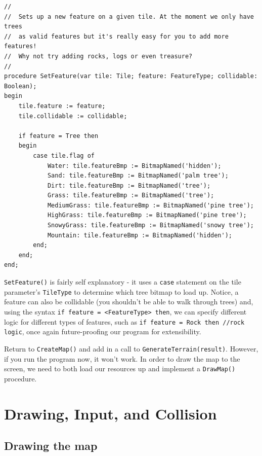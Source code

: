\documentclass{article}
\begin{document}
\begin{verbatim}
//
//	Sets up a new feature on a given tile. At the moment we only have trees
//	as valid features but it's really easy for you to add more features! 
//	Why not try adding rocks, logs or even treasure?
//
procedure SetFeature(var tile: Tile; feature: FeatureType; collidable: Boolean);
begin
	tile.feature := feature;
	tile.collidable := collidable;

	if feature = Tree then
	begin
		case tile.flag of
			Water: tile.featureBmp := BitmapNamed('hidden');
			Sand: tile.featureBmp := BitmapNamed('palm tree');
			Dirt: tile.featureBmp := BitmapNamed('tree');
			Grass: tile.featureBmp := BitmapNamed('tree');
			MediumGrass: tile.featureBmp := BitmapNamed('pine tree');
			HighGrass: tile.featureBmp := BitmapNamed('pine tree');
			SnowyGrass: tile.featureBmp := BitmapNamed('snowy tree');
			Mountain: tile.featureBmp := BitmapNamed('hidden');
		end;
	end;
end;
\end{verbatim}

\texttt{SetFeature()} is fairly self explanatory - it uses a \texttt{case} statement on the tile parameter's \texttt{TileType} to determine which tree bitmap to load up. Notice, a feature can also be collidable (you shouldn't be able to walk through trees) and, using the syntax \texttt{if feature = <FeatureType> then}, we can specify different logic for different types of features, such as \texttt{if feature = Rock then //rock logic}, once again future-proofing our program for extensibility.

Return to \texttt{CreateMap()} and add in a call to \texttt{GenerateTerrain(result)}. However, if you run the program now, it won't work. In order to draw the map to the screen, we need to both load our resources up and implement a \texttt{DrawMap()} procedure.

\section{Drawing, Input, and Collision}

\subsection{Drawing the map}
\end{document}
